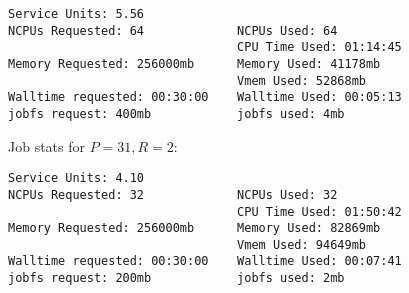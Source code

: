\documentclass[11pt]{report}
\begin{document}
\begin{verbatim}
Service Units: 5.56
NCPUs Requested: 64             NCPUs Used: 64
                                CPU Time Used: 01:14:45
Memory Requested: 256000mb      Memory Used: 41178mb
                                Vmem Used: 52868mb
Walltime requested: 00:30:00    Walltime Used: 00:05:13
jobfs request: 400mb            jobfs used: 4mb
\end{verbatim}

Job stats for $P=31, R=2$:

\begin{verbatim}
Service Units: 4.10
NCPUs Requested: 32             NCPUs Used: 32
                                CPU Time Used: 01:50:42
Memory Requested: 256000mb      Memory Used: 82869mb
                                Vmem Used: 94649mb
Walltime requested: 00:30:00    Walltime Used: 00:07:41
jobfs request: 200mb            jobfs used: 2mb
\end{verbatim}



%
\end{document}
